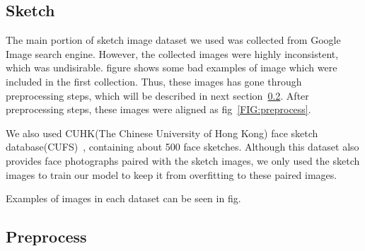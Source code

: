 \subsection{Sketch}

The main portion of sketch image dataset we used was collected from Google Image search engine. However, the collected images were highly inconsistent, which was undisirable. 
figure %
shows some bad examples of image which were included in the first collection. Thus, these images has gone through preprocessing steps, which will be described in next section~\ref{preprocess}.
After preprocessing steps, these images were aligned as fig~\ref{FIG:preprocess}.

We also used CUHK(The Chinese University of Hong Kong) face sketch database(CUFS)~\cite{CUHK_faces}, containing about 500 face sketches. 
Although this dataset also provides face photographs paired with the sketch images, we only used the sketch images to train our model to keep it from overfitting to these paired images.

Examples of images in each dataset can be seen in fig.%

\subsection{Preprocess}\label{preprocess}

